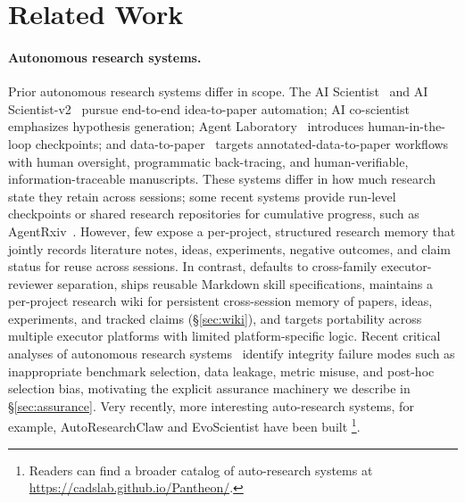 \section{Related Work}
\label{sec:related}

\paragraph{Autonomous research systems.}
Prior autonomous research systems differ in scope.
The AI Scientist~\citep{lu2024aiscientist} and AI Scientist-v2~\citep{yamada2025aiscientistv2} pursue end-to-end idea-to-paper automation; AI co-scientist~\citep{gottweis2025coscientist} emphasizes hypothesis generation; Agent Laboratory~\citep{schmidgall2025agentrxiv} introduces human-in-the-loop checkpoints; and data-to-paper~\citep{ifargan2024data2paper} targets annotated-data-to-paper workflows with human oversight, programmatic back-tracing, and human-verifiable, information-traceable manuscripts.
These systems differ in how much research state they retain across sessions; some recent systems provide run-level checkpoints or shared research repositories for cumulative progress, such as AgentRxiv~\citep{schmidgall2025agentrxiv}. However, few expose a per-project, structured research memory that jointly records literature notes, ideas, experiments, negative outcomes, and claim status for reuse across sessions.
In contrast, \aris{} defaults to cross-family executor-reviewer separation, ships reusable Markdown skill specifications, maintains a per-project research wiki for persistent cross-session memory of papers, ideas, experiments, and tracked claims (\S\ref{sec:wiki}), and targets portability across multiple executor platforms with limited platform-specific logic.
Recent critical analyses of autonomous research systems~\citep{luo2025aiscientistpitfalls} identify integrity failure modes such as inappropriate benchmark selection, data leakage, metric misuse, and post-hoc selection bias, motivating the explicit assurance machinery we describe in \S\ref{sec:assurance}. Very recently, more interesting auto-research systems, for example, AutoResearchClaw \citep{liu2026autoresearchclaw} and EvoScientist \citep{evoscientist2026} have been built \footnote{Readers can find a broader catalog of auto-research systems at \url{https://cadslab.github.io/Pantheon/}.}.

